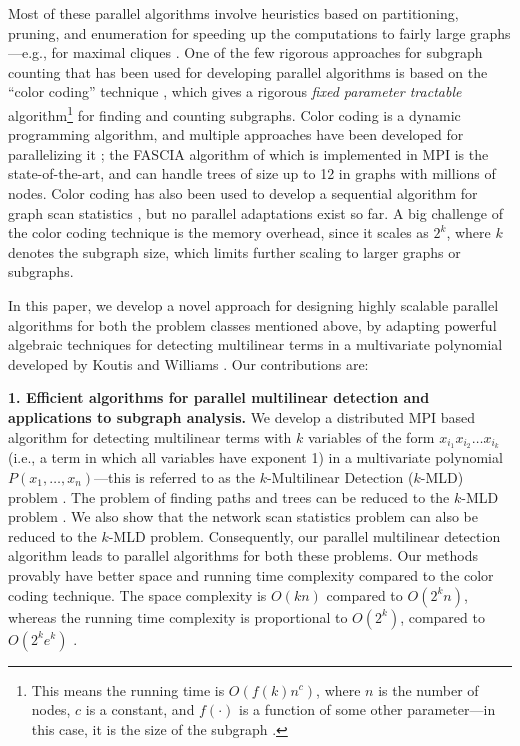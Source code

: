 Most of these parallel algorithms involve heuristics based on partitioning, pruning, and 
enumeration for speeding up the computations to fairly large graphs---e.g., for 
maximal cliques \cite{schmidt2009scalable, zhao2016parallel, aparicio:ispa14, cheng:kdd12, du:mcd09}.
One of the few rigorous approaches for subgraph counting that has been used for
developing parallel algorithms is based on the ``color coding'' technique
\cite{alon2008biomolecular, alon1995color}, which gives a rigorous \emph{fixed parameter tractable} algorithm\footnote{This means the running time is $O(f(k)n^c)$, where
$n$ is the number of nodes, $c$ is a constant, and $f(\cdot)$ is a function of some other
parameter---in this case, it is the size of the subgraph \cite{downey}.}
for finding and counting subgraphs. Color coding is a dynamic programming algorithm,
and multiple approaches have been developed for parallelizing it 
\cite{zhao2012sahad, slota:icpp13, slota:ipdps14}; the FASCIA algorithm of \cite{slota:icpp13, slota:ipdps14}
which is implemented in MPI is the state-of-the-art, and can handle trees
of size up to 12 in graphs with millions of nodes. 
Color coding has also been used to develop a
sequential algorithm for graph scan statistics \cite{cadena:sdm17}, but no parallel
adaptations exist so far.
A big challenge of the color coding technique is the memory overhead, since
it scales as $2^k$, where $k$ denotes the subgraph size, which limits further
scaling to larger graphs or subgraphs.  

In this paper, we develop a novel approach for designing highly scalable parallel
algorithms for both the problem classes mentioned above, by adapting
powerful algebraic techniques for
detecting multilinear terms in a multivariate polynomial developed by 
Koutis \cite{koutis:icalp08} and Williams \cite{williams2009finding}.
Our contributions are:

\noindent
\textbf{1. Efficient algorithms for parallel multilinear detection
and applications to subgraph analysis.}
We develop a distributed MPI based algorithm for detecting 
multilinear terms with $k$ variables of the form $x_{i_1}x_{i_2}\ldots x_{i_k}$ (i.e., a term in
which all variables have exponent 1) in a multivariate polynomial
$P(x_1,\ldots,x_n)$---this is referred to as the $k$-Multilinear Detection (\textsc{$k$-MLD}) problem
\cite{koutis:icalp08, williams2009finding}. The problem of finding paths and trees can
be reduced to the \textsc{$k$-MLD} problem \cite{koutis:icalp08}. We also show that the
network scan statistics problem can also be reduced to the \textsc{$k$-MLD} problem.
Consequently, our parallel multilinear detection algorithm leads to parallel algorithms
for both these problems. Our methods provably
have better space and running time complexity compared to the color coding technique.
The space complexity is $O(kn)$ compared to $O(2^kn)$, whereas the running time complexity is proportional to $O(2^k)$, compared to $O(2^ke^k)$
\cite{zhao2012sahad, slota:icpp13, slota:ipdps14}.

